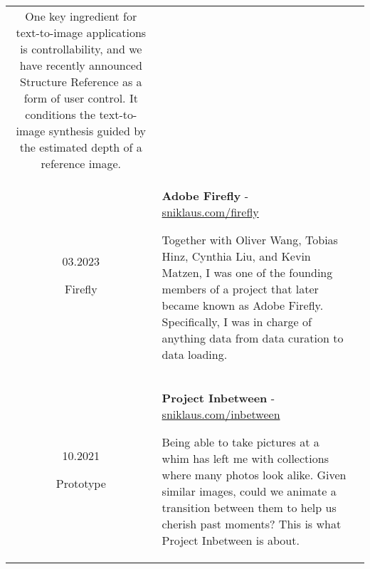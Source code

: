 \documentclass[10pt]{article}
\begin{document}
\begin{tabular}{C Z >{\setlength{\baselineskip}{0.9\baselineskip}}D}
{		\vspace{0.00cm}
		
		{\scriptsize One key ingredient for text-to-image applications is controllability, and we have recently announced Structure Reference as a form of user control. It conditions the text-to-image synthesis guided by the estimated depth of a reference image.}
		
		\vspace{0.0cm}
	}
	\\
	{
		03.2023
		
		\vspace{-0.05cm}
		
		{\scriptsize Firefly}
	}
	&
	{
		{\bf Adobe Firefly} - \href{https://sniklaus.com/firefly}{sniklaus.com/firefly}
		
		\vspace{0.00cm}
		
		{\scriptsize Together with Oliver Wang, Tobias Hinz, Cynthia Liu, and Kevin Matzen, I was one of the founding members of a project that later became known as Adobe Firefly. Specifically, I was in charge of anything data from data curation to data loading.}
		
		\vspace{0.0cm}
	}
	\\
	{
		10.2021
		
		\vspace{-0.05cm}
		
		{\scriptsize Prototype}
	}
	&
	{
		{\bf Project Inbetween} - \href{https://sniklaus.com/inbetween}{sniklaus.com/inbetween}
		
		\vspace{0.00cm}

		{\scriptsize Being able to take pictures at a whim has left me with collections where many photos look alike. Given similar images, could we animate a transition between them to help us cherish past moments? This is what Project Inbetween is about.}
	}
	\\
\end{tabular}
\end{document}
